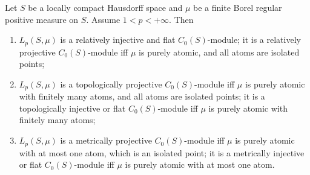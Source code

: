 \begin{proposition}\label{LpC0SModMetTopRelProjIngFlat} Let $S$ be a locally
compact Hausdorff space and $\mu$ be a finite Borel regular positive measure on
$S$. Assume $1<p<+\infty$. Then 

\begin{enumerate}[label = (\roman*)]
    \item $L_p(S,\mu)$ is a relatively injective and flat $C_0(S)$-module;
    it is a relatively projective $C_0(S)$-module iff $\mu$ is purely atomic,
    and all atoms are isolated points;

    \item $L_p(S,\mu)$ is a topologically projective $C_0(S)$-module iff $\mu$
    is purely atomic with finitely many atoms, and all atoms are isolated
    points; it is a topologically injective or flat $C_0(S)$-module iff $\mu$
    is purely atomic with finitely many atoms;

    \item $L_p(S,\mu)$ is a metrically projective $C_0(S)$-module iff $\mu$ is
    purely atomic with at most one atom, which is an isolated point; it is a
    metrically injective or flat $C_0(S)$-module iff $\mu$ is purely atomic
    with at most one atom.
\end{enumerate}
\end{proposition}
